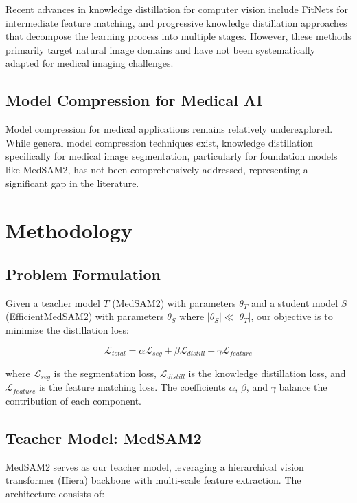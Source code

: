 \documentclass[conference]{IEEEtran}
\begin{document}
Recent advances in knowledge distillation for computer vision include FitNets \cite{romero2014fitnets} for intermediate feature matching, and progressive knowledge distillation approaches that decompose the learning process into multiple stages. However, these methods primarily target natural image domains and have not been systematically adapted for medical imaging challenges.

\subsection{Model Compression for Medical AI}

Model compression for medical applications remains relatively underexplored. While general model compression techniques exist, knowledge distillation specifically for medical image segmentation, particularly for foundation models like MedSAM2, has not been comprehensively addressed, representing a significant gap in the literature.

\section{Methodology}

\subsection{Problem Formulation}

Given a teacher model $T$ (MedSAM2) with parameters $\theta_T$ and a student model $S$ (EfficientMedSAM2) with parameters $\theta_S$ where $|\theta_S| \ll |\theta_T|$, our objective is to minimize the distillation loss:

\begin{equation}
\mathcal{L}_{total} = \alpha \mathcal{L}_{seg} + \beta \mathcal{L}_{distill} + \gamma \mathcal{L}_{feature}
\end{equation}

where $\mathcal{L}_{seg}$ is the segmentation loss, $\mathcal{L}_{distill}$ is the knowledge distillation loss, and $\mathcal{L}_{feature}$ is the feature matching loss. The coefficients $\alpha$, $\beta$, and $\gamma$ balance the contribution of each component.

\subsection{Teacher Model: MedSAM2}

MedSAM2 serves as our teacher model, leveraging a hierarchical vision transformer (Hiera) backbone with multi-scale feature extraction. The architecture consists of:
\end{document}
